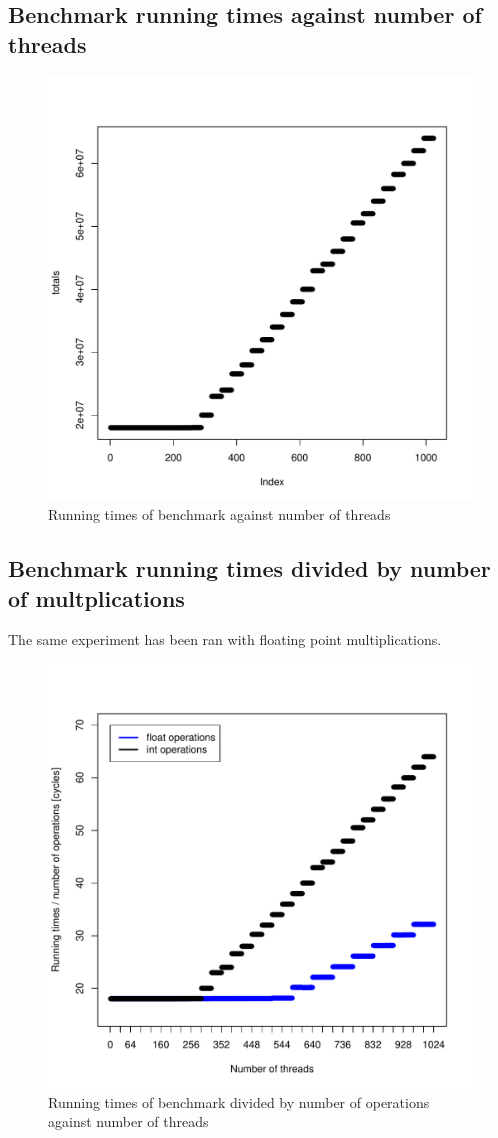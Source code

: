 \documentclass{article}
\begin{document}
	\subsection{Benchmark running times against number of threads}
    \begin{figure}[h]
	    \includegraphics[width=\linewidth]{"graphics/running_times"}
        \caption{Running times of benchmark against number of threads}
    \end{figure}
	\pagebreak

	\subsection{Benchmark running times divided by number of multplications}
	The same experiment has been ran with floating point multiplications. 
	\begin{figure}[h]
		\centering
		\vspace{-20pt}
    			\includegraphics[width=.5\linewidth]{"graphics/latency_estimate"}
		\vspace{-20pt}
		\caption{Running times of benchmark divided by number of operations against number of threads}
	\end{figure}
	\pagebreak
\end{document}

